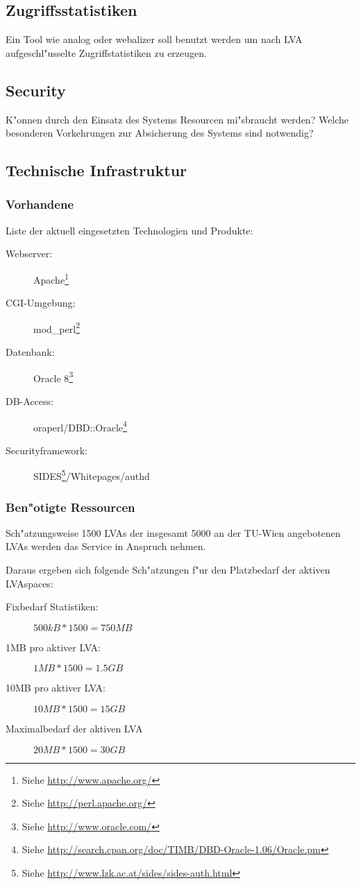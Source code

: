 \documentclass[12pt,a4paper]{article}
\begin{document}
\subsection{Zugriffsstatistiken}

Ein Tool wie analog oder webalizer soll benutzt werden um nach LVA
aufgeschl"usselte Zugriffstatistiken zu erzeugen.

\subsection{Security}

K"onnen durch den Einsatz des Systems Resourcen mi"sbraucht werden?
Welche besonderen Vorkehrungen zur Absicherung des Systems sind
notwendig?

\subsection{Technische Infrastruktur}

\subsubsection{Vorhandene}

Liste der aktuell eingesetzten Technologien und Produkte:
\begin{description}
\item[Webserver:]{Apache\footnote{Siehe \url{http://www.apache.org/}}}
\item[CGI-Umgebung:]{mod\_perl\footnote{Siehe \url{http://perl.apache.org/}}}
\item[Datenbank:]{Oracle 8\footnote{Siehe \url{http://www.oracle.com/}}}
\item[DB-Access:]{oraperl/DBD::Oracle\footnote{Siehe 
\url{http://search.cpan.org/doc/TIMB/DBD-Oracle-1.06/Oracle.pm}}}
\item[Securityframework:]{SIDES\footnote{Siehe \url{http://www.lzk.ac.at/sides/sides-auth.html}}/Whitepages/authd}
\end{description}

\subsubsection{Ben"otigte Ressourcen}

Sch"atzungsweise 1500 LVAs der insgesamt 5000 an der TU-Wien angebotenen
LVAs werden das Service in Anspruch nehmen.

Daraus ergeben sich folgende Sch"atzungen f"ur den Platzbedarf der aktiven
LVAspaces:
\begin{description}
\item[Fixbedarf Statistiken:]{$500kB*1500 = 750MB$}
\item[1MB pro aktiver LVA:]{$1MB*1500 = 1.5GB$}
\item[10MB pro aktiver LVA:]{$10MB*1500 = 15GB$}
\item[Maximalbedarf der aktiven LVA]{$20MB*1500 = 30GB$}
\end{description}
\end{document}
